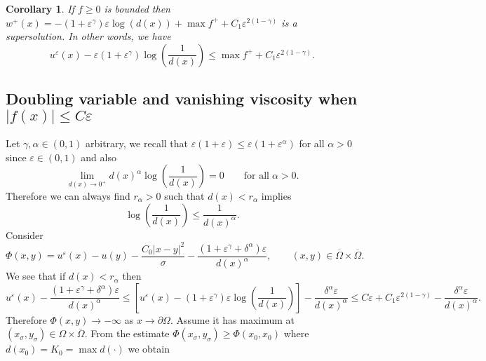 \documentclass[10pt]{article}
\theoremstyle{plain}
\newtheorem{cor}[thm]{Corollary}
\theoremstyle{remark}
\begin{document}
\begin{cor} If $f\geq 0$ is bounded then $w^+(x) = -(1+\varepsilon^\gamma)\varepsilon \log(d(x)) +\max f^+ + C_1\varepsilon^{2(1-\gamma)}$ is a supersolution. In other words, we have
\begin{equation*}
    u^\varepsilon(x) - \varepsilon(1+\varepsilon^\gamma) \log\left(\frac{1}{d(x)}\right) \leq  \max f^+ +C_1\varepsilon^{2(1-\gamma)}.
\end{equation*}
\end{cor}





\subsection{Doubling variable and vanishing viscosity when $|f(x)|\leq C\varepsilon$}
Let $\gamma,\alpha\in (0,1)$ arbitrary, we recall that $\varepsilon(1+\varepsilon)\leq \varepsilon(1+\varepsilon^\alpha)$ for all $\alpha > 0$ since $\varepsilon\in (0,1)$ and also
\begin{equation*}
    \lim_{d(x)\to 0^+} d(x)^\alpha \log\left(\frac{1}{d(x)}\right) = 0 \qquad \text{for all}\;\alpha >0.
\end{equation*}
Therefore we can always find $r_\alpha>0$ such that $d(x)<r_\alpha$ implies
 \begin{equation*}
     \log\left(\frac{1}{d(x)}\right) \leq \frac{1}{d(x)^\alpha}.
 \end{equation*}
Consider
\begin{equation*}
    \Phi(x,y) = u^\varepsilon(x)- u(y) - \frac{C_0|x-y|^2}{\sigma} - \frac{(1+\varepsilon^\gamma+\delta^\alpha)\varepsilon}{d(x)^\alpha} , \qquad (x,y)\in \overline{\Omega}\times\overline{\Omega}.
\end{equation*}
We see that if $d(x)<r_\alpha$ then
\begin{equation*}
    u^\varepsilon(x) - \frac{(1+\varepsilon^\gamma+\delta^\alpha)\varepsilon}{d(x)^\alpha}  \leq \left[u^\varepsilon(x) - (1+\varepsilon^\gamma)\varepsilon \log\left(\frac{1}{d(x)}\right)\right] - \frac{\delta^\alpha \varepsilon}{d(x)^\alpha} \leq  C\varepsilon + C_1\varepsilon^{2(1-\gamma)} - \frac{\delta^\alpha\varepsilon}{d(x)^\alpha}.
\end{equation*}
Therefore $\Phi(x,y)\to -\infty$ as $x\to \partial \Omega$. Assume it has maximum at $(x_\sigma,y_\sigma)\in \Omega\times \overline{\Omega}$. From the estimate $\Phi(x_\sigma,y_\sigma) \geq \Phi(x_0,x_0)$ where $d(x_0) = K_0 = \max d(\cdot)$ we obtain
\end{document}
